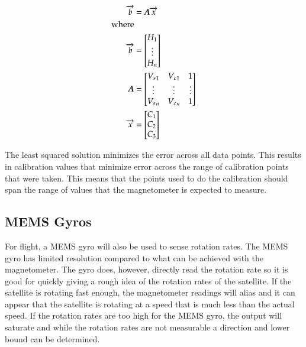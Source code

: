 \begin{equation}
    \label{eq:magmat}
    \begin{split}
    \vect{b}&=\matt{A} \vect{x} \\
    {\text{\raggedright where}} \\
    \vect{b}&= 
    \begin{bmatrix}
        H_1 \\
        \vdots \\
        H_n \\
    \end{bmatrix} \\
    \matt{A}&=
    \begin{bmatrix}
        {V_s}_1 & {V_c}_1 & 1 \\
        \vdots & \vdots & \vdots\\
        {V_s}_n & {V_c}_n & 1 \\
    \end{bmatrix} \\
    \vect{x}&= 
    \begin{bmatrix}
        C_1 \\
        C_2 \\
        C_3 \\
    \end{bmatrix} 
    \end{split}
\end{equation}

The least squared solution minimizes the error across all data points. This results in calibration values that minimize error across the range of calibration points that were taken. This means that the points used to do the calibration should span the range of values that the magnetometer is expected to measure. 

\subsection{\acs{MEMS} Gyros}

For flight, a \ac{MEMS} gyro will also be used to sense rotation rates. The \ac{MEMS} gyro has limited resolution compared to what can be achieved with the magnetometer. The gyro does, however, directly read the rotation rate so it is good for quickly giving a rough idea of the rotation rates of the satellite. If the satellite is rotating fast enough, the magnetometer readings will alias and it can appear that the satellite is rotating at a speed that is much less than the actual speed. If the rotation rates are too high for the \ac{MEMS} gyro, the output will saturate and while the rotation rates are not measurable a direction and lower bound can be determined.


